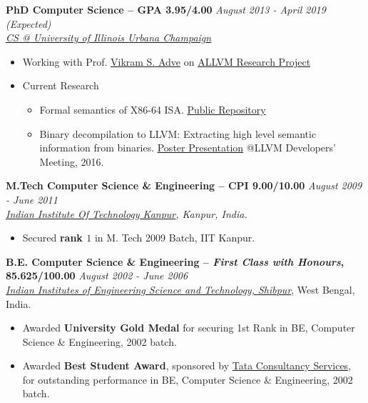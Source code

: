 \documentclass[9pt]{article}
\newenvironment{changemargin}[2]{%
  \begin{list}{}{%
    \setlength{\topsep}{0pt}%
    \setlength{\leftmargin}{#1}%
    \setlength{\rightmargin}{#2}%
    \setlength{\listparindent}{\parindent}%
    \setlength{\itemindent}{\parindent}%
    \setlength{\parsep}{\parskip}%
  }%
  \item[]}{\end{list}
}
\newenvironment{body} {
	\vspace*{-16pt}
	\begin{changemargin}{-0.25in}{-0.5in}
  }	
	{\end{changemargin}
}
\begin{document}
\begin{body}
	\vspace{14pt}

        \textbf{PhD Computer Science -- GPA 3.95/4.00}{} \hfill \emph{August 2013 - April 2019 (Expected)}{} \\
	\emph{\href{http://cs.illinois.edu/}{CS @ University of Illinois Urbana Champaign}}{} \\
	\begin{itemize} \itemsep -0pt
            \item  Working with Prof.
              \href{http://vikram.cs.illinois.edu/}{Vikram S.
              Adve} on \href{https://publish.illinois.edu/allvm-project/}{ALLVM
              Research Project}
          \item  Current Research 
            \begin{itemize} 
              \item Formal semantics of X86-64 ISA. {\href{https://github.com/kframework/X86-64-semantics}{Public Repository}}
              \item Binary decompilation to LLVM: Extracting high level semantic information from binaries.
                \href{https://www.dropbox.com/s/8s20r8pi3eu4knw/allin_poster.pdf?dl=0}{Poster Presentation} @LLVM Developers' Meeting, 2016.
            \end{itemize} 
        \end{itemize}
 \medskip
	\textbf{M.Tech Computer Science \& Engineering -- CPI 9.00/10.00}{} \hfill \emph{August 2009 - June 2011}{} \\
	\emph{\href{http://www.iitk.ac.in/}{Indian Institute Of Technology Kanpur}, Kanpur, India.}{} \\
	\begin{itemize} \itemsep -0pt
		\item Secured \textbf{rank $1$} in M. Tech 2009 Batch, IIT Kanpur.
	\end{itemize}
  \medskip
	\textbf{B.E. Computer Science \& Engineering -- \emph{First Class with Honours}, 85.625/100.00} \hfill \emph{August 2002 - June 2006} \\
	\emph{\href{http://www.iiests.ac.in/}{Indian Institutes of Engineering Science and Technology, Shibpur}}, West Bengal, India.\\
	\begin{itemize} \itemsep -0pt
		\item Awarded \textbf{University Gold Medal} for securing 1st Rank in BE, Computer Science \& Engineering, 2002 batch.
		\item Awarded \textbf{Best Student Award}, sponsored by \href{http://www.tcs.com}{Tata Consultancy Services}, for outstanding performance in BE, Computer Science \& Engineering, 2002 batch.
	\end{itemize}
\end{body}
\end{document}
